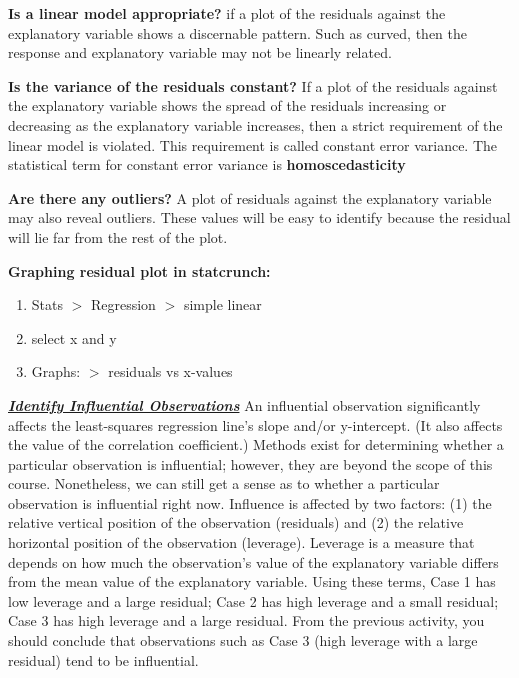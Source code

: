 \documentclass{report}
\begin{document}
    \bigbreak \noindent 
    \textbf{Is a linear model appropriate?}
    \bigbreak \noindent 
    if a plot of the residuals against the explanatory variable shows a discernable pattern. Such as curved, then the response and explanatory variable may not be linearly related.

    \bigbreak \noindent 
    \textbf{Is the variance of the residuals constant?}
    \bigbreak \noindent 
    If a plot of the residuals against the explanatory variable shows the spread of the residuals increasing or decreasing as the explanatory variable increases, then a strict requirement of the linear model is violated.
    \bigbreak \noindent 
    This requirement is called constant error variance. The statistical term for constant error variance is \textbf{homoscedasticity}

    \bigbreak \noindent 
    \textbf{Are there any outliers?}
    \bigbreak \noindent 
    A plot of residuals against the explanatory variable may also reveal outliers. These values will be easy to identify because the residual will lie far from the rest of the plot.

    \bigbreak \noindent 
    \textbf{Graphing residual plot in statcrunch:}
    \begin{enumerate}
        \item Stats $> $ Regression $> $ simple linear
        \item select x and y
        \item Graphs: $> $ residuals vs x-values
    \end{enumerate}

    \pagebreak \bigbreak \noindent
    \textbf{\textit{\underline{Identify Influential Observations}}}
    \bigbreak \noindent 
    An influential observation significantly affects the least-squares regression line's slope and/or y-intercept. (It also affects the value of the correlation coefficient.) Methods exist for determining whether a particular observation is influential; however, they are beyond the scope of this course. Nonetheless, we can still get a sense as to whether a particular observation is influential right now.
    \bigbreak \noindent 
    Influence is affected by two factors: (1) the relative vertical position of the observation (residuals) and (2) the relative horizontal position of the observation (leverage). Leverage is a measure that depends on how much the observation's value of the explanatory variable differs from the mean value of the explanatory variable. Using these terms, Case 1 has low leverage and a large residual; Case 2 has high leverage and a small residual; Case 3 has high leverage and a large residual. From the previous activity, you should conclude that observations such as Case 3 (high leverage with a large residual) tend to be influential.
\end{document}
